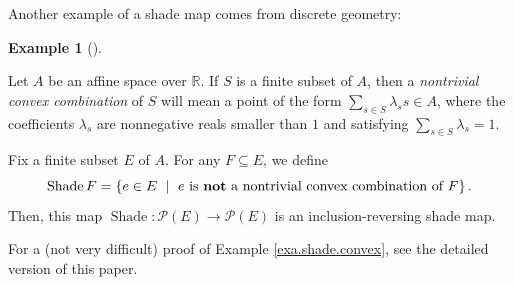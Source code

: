 \documentclass[numbers=enddot,12pt,final,onecolumn]{scrartcl}%
\theoremstyle{definition}
\newtheorem{exam}[theo]{Example}
\newenvironment{example}[1][]
{\begin{exam}[#1]\begin{leftbar}}
{\end{leftbar}\end{exam}}
\let\sumnonlimits\sum
\renewcommand{\sum}{\sumnonlimits\limits}
\newenvironment{vershort}{}{}
\begin{document}
Another example of a shade map comes from discrete geometry:

\begin{example}
\label{exa.shade.convex}Let $A$ be an affine space over $\mathbb{R}$. If $S$
is a finite subset of $A$, then a \emph{nontrivial convex combination} of $S$
will mean a point of the form $\sum_{s\in S}\lambda_{s}s\in A$, where the
coefficients $\lambda_{s}$ are nonnegative reals smaller than $1$ and
satisfying $\sum_{s\in S}\lambda_{s}=1$.

Fix a finite subset $E$ of $A$. For any $F\subseteq E$, we define%
\[
\operatorname*{Shade}F=\left\{  e\in E\ \mid\ e\text{ is \textbf{not} a
nontrivial convex combination of }F\right\}  .
\]
Then, this map $\operatorname*{Shade}:\mathcal{P}\left(  E\right)
\rightarrow\mathcal{P}\left(  E\right)  $ is an inclusion-reversing shade map.
\end{example}

\begin{vershort}
For a (not very difficult) proof of Example \ref{exa.shade.convex}, see the
detailed version \cite{verlong} of this paper.
\end{vershort}
\end{document}

